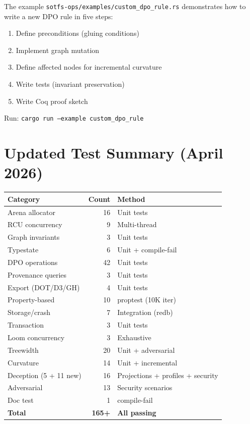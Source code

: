 \documentclass[11pt,a4paper,twoside]{report}
\theoremstyle{definition}
\begin{document}
The example \texttt{sotfs-ops/examples/custom\_dpo\_rule.rs} demonstrates how to
write a new DPO rule in five steps:
\begin{enumerate}
\item Define preconditions (gluing conditions)
\item Implement graph mutation
\item Define affected nodes for incremental curvature
\item Write tests (invariant preservation)
\item Write Coq proof sketch
\end{enumerate}

Run: \texttt{cargo run --example custom\_dpo\_rule}

\chapter{Updated Test Summary (April 2026)}

\begin{center}\small
\begin{tabular}{lrl}
\toprule
\textbf{Category} & \textbf{Count} & \textbf{Method} \\
\midrule
Arena allocator       & 16 & Unit tests \\
RCU concurrency       &  9 & Multi-thread \\
Graph invariants      &  3 & Unit tests \\
Typestate             &  6 & Unit + compile-fail \\
DPO operations        & 42 & Unit tests \\
Provenance queries    &  3 & Unit tests \\
Export (DOT/D3/GH)    &  4 & Unit tests \\
Property-based        & 10 & proptest (10K iter) \\
Storage/crash         &  7 & Integration (redb) \\
Transaction           &  3 & Unit tests \\
Loom concurrency      &  3 & Exhaustive \\
Treewidth             & 20 & Unit + adversarial \\
Curvature             & 14 & Unit + incremental \\
Deception (5 + 11 new) & 16 & Projections + profiles + security \\
Adversarial           & 13 & Security scenarios \\
Doc test              &  1 & compile-fail \\
\midrule
\textbf{Total}        & \textbf{165+} & \textbf{All passing} \\
\bottomrule
\end{tabular}
\end{center}
\end{document}
